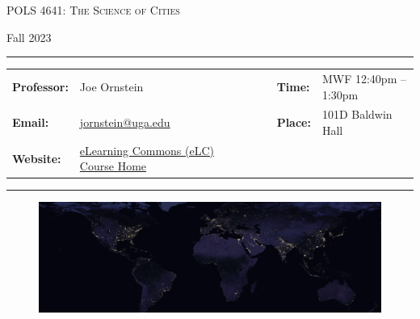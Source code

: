 \documentclass[11pt, letterpaper]{article}
\begin{document}
\begin{center}
{\Large \textsc{POLS 4641: The Science of Cities}}
\end{center}
\begin{center}
{\large Fall 2023}
\end{center}

\begin{center}
\rule{6.5in}{0.4pt}
\begin{minipage}[t]{.96\textwidth}
\begin{tabular}{llcccll}
\textbf{Professor:} & Joe Ornstein & & &  & \textbf{Time:} & MWF 12:40pm -- 1:30pm \\
\textbf{Email:} &  \href{mailto:jornstein@uga.edu}{jornstein@uga.edu} & & & & \textbf{Place:} & 101D Baldwin Hall\\
\textbf{Website:} & \href{https://uga.view.usg.edu/d2l/home/2935828}{eLearning Commons (eLC) Course Home} & & & & &
\end{tabular}
\end{minipage}
\rule{6.5in}{0.4pt}
\end{center}
\vspace{.15cm}
\setlength{\unitlength}{1in}
\renewcommand{\arraystretch}{2}

\begin{figure}[h]
	\centering
	\includegraphics[width = 1.03\textwidth]{img/night-lights-cropped.jpg}
\end{figure}


\onehalfspacing

\end{document}
